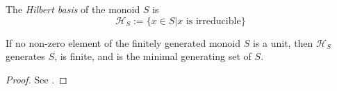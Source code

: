 \begin{definition}
  \label{0-hilbert-basis}

  The \emph{Hilbert basis} of the monoid $S$ is
  \[
    \mathcal H_S := \{x \in S | x \text{ is irreducible}\}
  \]
\end{definition}


\begin{proposition}
  \label{0-hilbert-basis-finite}

  If no non-zero element of the finitely generated monoid $S$ is a unit, then $\mathcal H_S$ generates $S$, is finite, and is the minimal generating set of $S$.
\end{proposition}
\begin{proof}
  \uses{}

  See \cite{Cox_2011}.
\end{proof}
